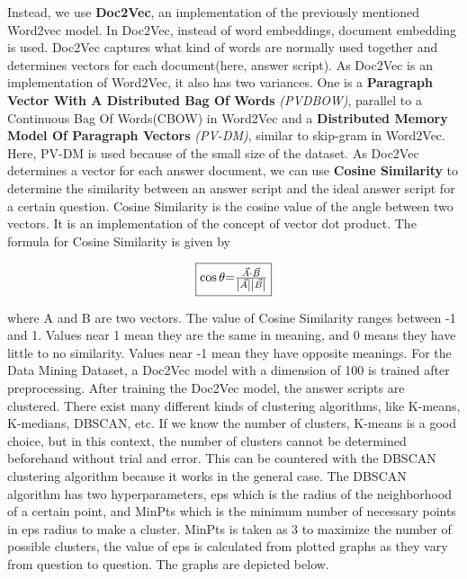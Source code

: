 \par
Instead, we use \textbf{Doc2Vec}, an implementation of the previously mentioned Word2vec model. In Doc2Vec, instead of word embeddings, document embedding is used. Doc2Vec captures what kind of words are normally used together and determines vectors for each document(here, answer script). As Doc2Vec is an implementation of Word2Vec, it also has two variances. One is a \textbf{Paragraph Vector With A Distributed Bag Of Words} \textit{(PVDBOW)}, parallel to a Continuous Bag Of Words(CBOW) in Word2Vec and a \textbf{Distributed Memory Model Of Paragraph Vectors} \textit{(PV-DM)}, similar to skip-gram in Word2Vec. Here, PV-DM is used because of the small size of the dataset. As Doc2Vec determines a vector for each answer document, we can use \textbf{Cosine Similarity} to determine the similarity between an answer script and the ideal answer script for a certain question. Cosine Similarity is the cosine value of the angle between two vectors. It is an implementation of the concept of vector dot product. The formula for Cosine Similarity is given by
\par
\begin{equation}
    \boxed{\cos{\theta} $=$ \frac{\Vec{A} \cdot \Vec{B}}{\left | \Vec{A}\right |  \left | \Vec{B}\right |}}
\end{equation}
\par
where A and B are two vectors. The value of Cosine Similarity ranges between -1 and 1. Values near 1 mean they are the same in meaning, and 0 means they have little to no similarity. Values near -1 mean they have opposite meanings. For the Data Mining Dataset, a Doc2Vec model with a dimension of 100 is trained after preprocessing. After training the Doc2Vec model, the answer scripts are clustered.
There exist many different kinds of clustering algorithms, like K-means, K-medians, DBSCAN, etc. If we know the number of clusters, K-means is a good choice, but in this context, the number of clusters cannot be determined beforehand without trial and error. This can be countered with the DBSCAN clustering algorithm because it works in the general case. The DBSCAN algorithm has two hyperparameters, eps which is the radius of the neighborhood of a certain point, and MinPts which is the minimum number of necessary points in eps radius to make a cluster. MinPts is taken as 3 to maximize the number of possible clusters, the value of eps is calculated from plotted graphs as they vary from question to question. The graphs are depicted below. \\

